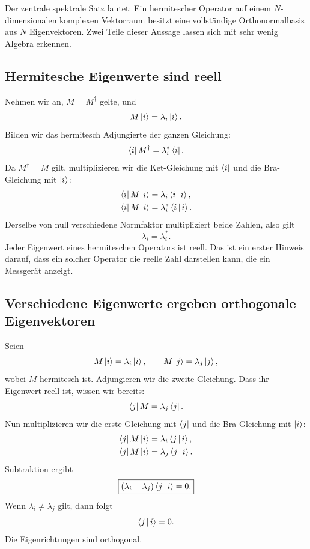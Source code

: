 Der zentrale spektrale Satz lautet: Ein hermitescher Operator auf einem \(N\)-dimensionalen komplexen Vektorraum besitzt eine vollständige Orthonormalbasis aus \(N\) Eigenvektoren. Zwei Teile dieser Aussage lassen sich mit sehr wenig Algebra erkennen.

\subsection{Hermitesche Eigenwerte sind reell}

Nehmen wir an, \(M=M^\dagger\) gelte, und
\[
M\left\lvert i\right\rangle=\lambda_i\left\lvert i\right\rangle.
\]
Bilden wir das hermitesch Adjungierte der ganzen Gleichung:
\begin{equation}
\left\langle i\right\rvert M^\dagger=\lambda_i^*\left\langle i\right\rvert.
\label{eq:eigen-bra-equation}
\end{equation}
Da \(M^\dagger=M\) gilt, multiplizieren wir die Ket-Gleichung mit \(\left\langle i\right\rvert\) und die Bra-Gleichung mit \(\left\lvert i\right\rangle\):
\begin{align}
\left\langle i\right\rvert M\left\lvert i\right\rangle&=\lambda_i\left\langle i\,\middle|\,i\right\rangle,\\
\left\langle i\right\rvert M\left\lvert i\right\rangle&=\lambda_i^*\left\langle i\,\middle|\,i\right\rangle.
\end{align}
Derselbe von null verschiedene Normfaktor multipliziert beide Zahlen, also gilt
\begin{equation}
\lambda_i=\lambda_i^*.
\end{equation}
Jeder Eigenwert eines hermiteschen Operators ist reell. Das ist ein erster Hinweis darauf, dass ein solcher Operator die reelle Zahl darstellen kann, die ein Messgerät anzeigt.

\subsection{Verschiedene Eigenwerte ergeben orthogonale Eigenvektoren}

Seien
\[
M\left\lvert i\right\rangle=\lambda_i\left\lvert i\right\rangle,
\qquad
M\left\lvert j\right\rangle=\lambda_j\left\lvert j\right\rangle,
\]
wobei \(M\) hermitesch ist. Adjungieren wir die zweite Gleichung. Dass ihr Eigenwert reell ist, wissen wir bereits:
\[
\left\langle j\right\rvert M=\lambda_j\left\langle j\right\rvert.
\]
Nun multiplizieren wir die erste Gleichung mit \(\left\langle j\right\rvert\) und die Bra-Gleichung mit \(\left\lvert i\right\rangle\):
\begin{align}
\left\langle j\right\rvert M\left\lvert i\right\rangle&=\lambda_i\left\langle j\,\middle|\,i\right\rangle,\\
\left\langle j\right\rvert M\left\lvert i\right\rangle&=\lambda_j\left\langle j\,\middle|\,i\right\rangle.
\end{align}
Subtraktion ergibt
\begin{equation}
\boxed{(\lambda_i-\lambda_j)\left\langle j\,\middle|\,i\right\rangle=0.}
\label{eq:hermitian-orthogonality}
\end{equation}
Wenn \(\lambda_i\ne\lambda_j\) gilt, dann folgt
\[
\left\langle j\,\middle|\,i\right\rangle=0.
\]
Die Eigenrichtungen sind orthogonal.

